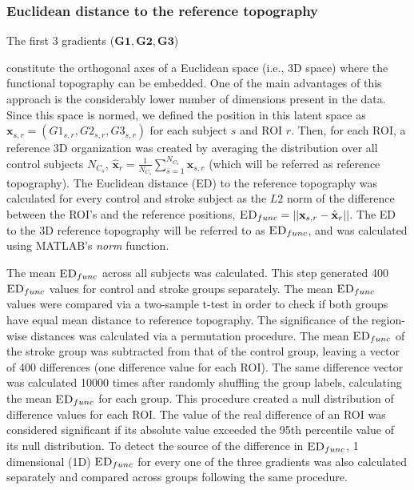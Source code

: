\documentclass[fleqn,10pt]{wlscirep}
\begin{document}
\subsubsection*{Euclidean distance to the reference topography}

The first 3 gradients ($\textbf{G1},\textbf{G2},\textbf{G3}$) 
constitute the orthogonal axes of a Euclidean space (i.e., 3D space) where the functional topography can be embedded. One of the main advantages of this approach is the considerably lower number of dimensions present in the data. Since this space is normed, we defined the position in this latent space as $\textbf{x}_{s,r}=(G1_{s,r},G2_{s,r},G3_{s,r})$ for each subject $s$ and ROI $r$. Then, for each ROI, a reference 3D organization was created by averaging the distribution over all control subjects $N_{C_s}$, $\hat{\textbf{x}}_{r}=\frac{1}{N_{C_s}}\sum_{s=1 }^{N_{C_s}}\textbf{x}_{s,r}$ (which will be referred as reference topography). The Euclidean distance (ED) to the reference topography was calculated for every control and stroke subject as the $L2$ norm of the difference between the ROI's and the reference positions, $\textsc{ED}_{{func}}=||\textbf{x}_{s,r}-\hat{\textbf{x}}_{r}||$. The ED to the 3D reference topography will be referred to as $\textsc{ED}_{{func}}$, and was calculated using MATLAB's \emph{norm} function.

The mean $\textsc{ED}_{{func}}$ across all subjects was calculated. This step generated 400 $\textsc{ED}_{{func}}$ values for control and stroke groups separately. The mean $\textsc{ED}_{{func}}$ values were compared via a two-sample t-test in order to check if both groups have equal mean distance to reference topography. The significance of the region-wise distances was calculated via a permutation procedure. The mean $\textsc{ED}_{{func}}$ of the stroke group was subtracted from that of the control group, leaving a vector of 400 differences (one difference value for each ROI). The same difference vector was calculated 10000 times after randomly shuffling the group labels, calculating the mean   $\textsc{ED}_{{func}}$ for each group. This procedure created a null distribution of difference values for each ROI. The value of the real difference of an ROI was considered significant if its absolute value exceeded the 95th percentile value of its null distribution. To detect the source of the difference in $\textsc{ED}_{{func}}$, 1 dimensional (1D) $\textsc{ED}_{func}$ for every one of the three gradients was also calculated separately and compared across groups following the same procedure.
\end{document}
